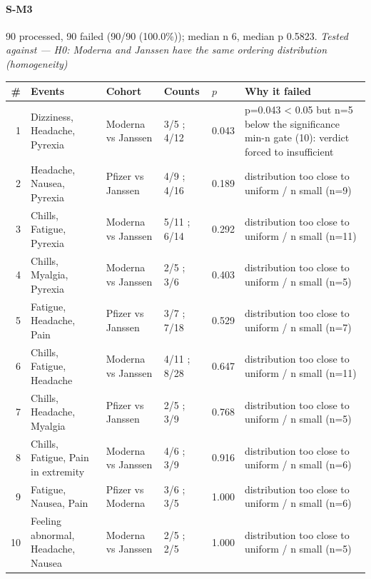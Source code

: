\documentclass[11pt]{article}
\begin{document}
\paragraph{S-M3} 90 processed, 90 failed (90/90 (100.0\%)); median n 6, median p 0.5823. \emph{Tested against --- H0: Moderna and Janssen have the same ordering distribution (homogeneity)} \\
\begin{longtable}{@{}r p{3.9cm} p{2.5cm} l l p{4.4cm}@{}}
\toprule
\# & Events & Cohort & Counts & $p$ & Why it failed \\
\midrule \endhead
1 & Dizziness, Headache, Pyrexia & Moderna vs Janssen & 3/5 ; 4/12 & 0.043 & p=0.043 < 0.05 but n=5 below the significance min-n gate (10): verdict forced to insufficient \\
2 & Headache, Nausea, Pyrexia & Pfizer vs Janssen & 4/9 ; 4/16 & 0.189 & distribution too close to uniform / n small (n=9) \\
3 & Chills, Fatigue, Pyrexia & Moderna vs Janssen & 5/11 ; 6/14 & 0.292 & distribution too close to uniform / n small (n=11) \\
4 & Chills, Myalgia, Pyrexia & Moderna vs Janssen & 2/5 ; 3/6 & 0.403 & distribution too close to uniform / n small (n=5) \\
5 & Fatigue, Headache, Pain & Pfizer vs Janssen & 3/7 ; 7/18 & 0.529 & distribution too close to uniform / n small (n=7) \\
6 & Chills, Fatigue, Headache & Moderna vs Janssen & 4/11 ; 8/28 & 0.647 & distribution too close to uniform / n small (n=11) \\
7 & Chills, Headache, Myalgia & Pfizer vs Janssen & 2/5 ; 3/9 & 0.768 & distribution too close to uniform / n small (n=5) \\
8 & Chills, Fatigue, Pain in extremity & Moderna vs Janssen & 4/6 ; 3/9 & 0.916 & distribution too close to uniform / n small (n=6) \\
9 & Fatigue, Nausea, Pain & Pfizer vs Moderna & 3/6 ; 3/5 & 1.000 & distribution too close to uniform / n small (n=6) \\
10 & Feeling abnormal, Headache, Nausea & Moderna vs Janssen & 2/5 ; 2/5 & 1.000 & distribution too close to uniform / n small (n=5) \\
\bottomrule
\end{longtable}
\end{document}
